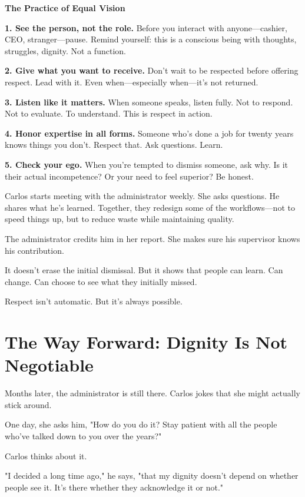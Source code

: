 \documentclass[11pt,twoside]{book}
\begin{document}
\begin{practicebox}
\textbf{The Practice of Equal Vision}

\textbf{1. See the person, not the role.} Before you interact with anyone—cashier, CEO, stranger—pause. Remind yourself: this is a conscious being with thoughts, struggles, dignity. Not a function.

\textbf{2. Give what you want to receive.} Don't wait to be respected before offering respect. Lead with it. Even when—especially when—it's not returned.

\textbf{3. Listen like it matters.} When someone speaks, listen fully. Not to respond. Not to evaluate. To understand. This is respect in action.

\textbf{4. Honor expertise in all forms.} Someone who's done a job for twenty years knows things you don't. Respect that. Ask questions. Learn.

\textbf{5. Check your ego.} When you're tempted to dismiss someone, ask why. Is it their actual incompetence? Or your need to feel superior? Be honest.
\end{practicebox}

Carlos starts meeting with the administrator weekly. She asks questions. He shares what he's learned. Together, they redesign some of the workflows—not to speed things up, but to reduce waste while maintaining quality.

The administrator credits him in her report. She makes sure his supervisor knows his contribution.

It doesn't erase the initial dismissal. But it shows that people can learn. Can change. Can choose to see what they initially missed.

Respect isn't automatic. But it's always possible.

\section*{The Way Forward: Dignity Is Not Negotiable}

Months later, the administrator is still there. Carlos jokes that she might actually stick around.

One day, she asks him, "How do you do it? Stay patient with all the people who've talked down to you over the years?"

Carlos thinks about it.

"I decided a long time ago," he says, "that my dignity doesn't depend on whether people see it. It's there whether they acknowledge it or not."
\end{document}

